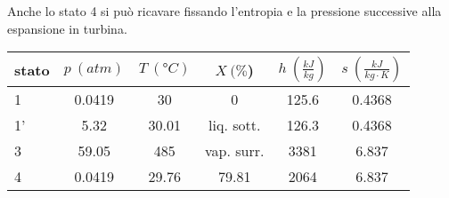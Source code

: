 Anche lo stato 4 si può ricavare fissando l'entropia e la pressione successive alla espansione in turbina.

\begin{center}
    \begin{tabular}{l|c|c|c|c|c}
        stato    & $p\ (atm)$ & $T\ (\text{°}C) $&$X\ (\%$)& $h\ (\frac{kJ}{kg})$  & $s\ (\frac{kJ}{kg\cdot K})$\\ \hline
        1   &        0.0419 &            30   &    0      & 125.6    &0.4368 \\ \hline     %
        1'  &        5.32    &           30.01   &liq. sott.  & 126.3&0.4368 \\ \hline      %
        3   &        59.05  &            485&  vap. surr.    &  3381 &6.837  \\ \hline      %
        4   &        0.0419       &      29.76&     79.81 &    2064  &6.837                %
    \end{tabular}
\end{center}
